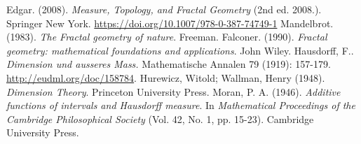 \begin{thebibliography}{99}
    
 Edgar. (2008). \textit{Measure, Topology, and Fractal Geometry} (2nd ed. 2008.). Springer New York. \url{https://doi.org/10.1007/978-0-387-74749-1}
 Mandelbrot. (1983). \textit{The Fractal geometry of nature}. Freeman.
 Falconer. (1990). \textit{Fractal geometry: mathematical foundations and applications}. John Wiley.
 Hausdorff, F.. \textit{Dimension und ausseres Mass.} Mathematische Annalen 79 (1919): 157-179. \url{http://eudml.org/doc/158784}.
Hurewicz, Witold; Wallman, Henry (1948). \textit{Dimension Theory}. Princeton University Press.
Moran, P. A. (1946). \textit{Additive functions of intervals and Hausdorff measure}. In \textit{Mathematical Proceedings of the Cambridge Philosophical Society} (Vol. 42, No. 1, pp. 15-23). Cambridge University Press.

\end{thebibliography}
